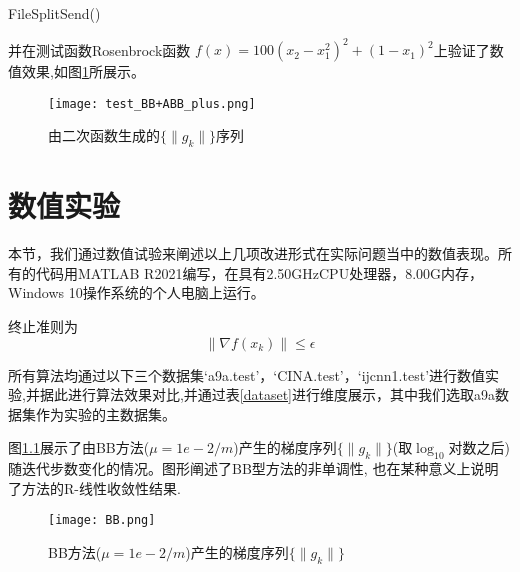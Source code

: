 \begin{algorithm}[H]
	\SetAlgoLined
	\caption{FileSplitSend()\label{chap:chap02:alg:SPLITFILE:expire}}
\end{algorithm}
并在测试函数Rosenbrock函数  $f(x)=100(x_{2}-x_{1}^{2})^{2}+(1-x_{1})^{2}  $上验证了数值效果,如图\ref{testbb}所展示。
\begin{figure}
	\centering
	\texttt{[image: test\_BB+ABB\_plus.png]}
	\caption{由二次函数生成的$ \{ \|  g_{k} \| \} $序列}
	\label{testbb}
\end{figure}


\chapter{\hei 数值实验}

本节，我们通过数值试验来阐述以上几项改进形式在实际问题当中的数值表现。所有的代码用MATLAB R2021编写，在具有2.50GHzCPU处理器，8.00G内存，Windows 10操作系统的个人电脑上运行。


终止准则为
$$ \| \nabla f(x_{k}) \| \leq \epsilon $$

所有算法均通过以下三个数据集‘a9a.test’，‘CINA.test’，‘ijcnn1.test’进行数值实验,并据此进行算法效果对比,并通过表\ref{dataset}进行维度展示，其中我们选取a9a数据集作为实验的主数据集。


图\ref{BBq}展示了由BB方法($\mu=1 e-2 / m$)产生的梯度序列$ \{ \|  g_{k} \| \} $(取$ \log_{10} $对数之后)随迭代步数变化的情况。图形阐述了BB型方法的非单调性, 也在某种意义上说明了方法的R-线性收敛性结果.
\begin{figure}
	\centering
	\texttt{[image: BB.png]}
	\caption{BB方法($\mu=1 e-2 / m$)产生的梯度序列$ \{ \|  g_{k} \| \} $}
	\label{BBq}
\end{figure}

